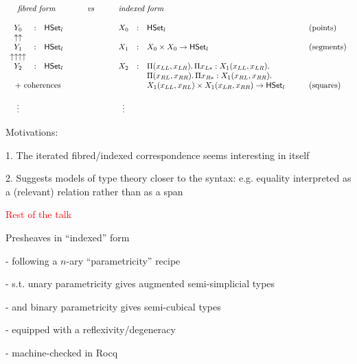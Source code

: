 \documentclass[12pt,landscape]{article}
\begin{document}
\begin{LARGE}
\begin{sf}
$$
\begin{array}{cllccllll}
\multicolumn{3}{c}{\mbox{\emph{fibred form}}} & \qquad\mathit{vs}\qquad & \multicolumn{3}{l}{\mbox{\emph{indexed form}}} \\
\\
Y_0 &:& \HSet_l & & X_0 & : & \HSet_l & \mbox{(points)}\\
\uparrow\uparrow \\
Y_1 &:& \HSet_l & & X_1 & : & X_0 \times X_0 \rightarrow \HSet_l & \mbox{(segments)}\\
\uparrow\uparrow\uparrow\uparrow \\
Y_2 &:& \HSet_l & & X_2 & : & \Pi (x_{LL},x_{LR}).\, \Pi x_{L*}:X_1 (x_{LL},x_{LR}).\\
& & & & & & \Pi (x_{RL},x_{RR}).\, \Pi x_{R*}:X_1 (x_{RL},x_{RR}).\, \\
\multicolumn{3}{c}{\mbox{~+ coherences}} & & & & X_1 (x_{LL},x_{RL}) \times X_1 (x_{LR},x_{RR}) \rightarrow \HSet_l \qquad & \mbox{(squares)}\\
\\
\vdots & & & & \vdots\\
\end{array}
$$

Motivations:

1. The iterated fibred/indexed correspondence seems interesting in itself

2. Suggests models of type theory closer to the syntax: e.g. equality
interpreted as a (relevant) relation rather than as a span

\newpage

\begin{center}
\textcolor{red}{\huge Rest of the talk}
\end{center}

\bigskip
\noindent Presheaves in ``indexed'' form
\bigskip

\quad - following a $n$-ary ``parametricity'' recipe
\bigskip

\qquad - s.t. unary parametricity gives augmented semi-simplicial types
\bigskip

\qquad - and binary parametricity gives semi-cubical types
\bigskip

\quad - equipped with a reflexivity/degeneracy
\bigskip

\quad - machine-checked in Rocq




\end{sf}
\end{LARGE}
\end{document}
